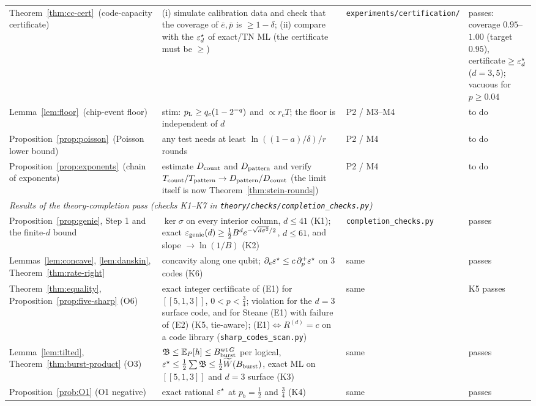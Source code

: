 {\begin{longtable}{p{3.7cm} p{4.5cm} p{3.2cm} p{2.6cm}}
Theorem~\ref{thm:cc-cert}\ (code-capacity certificate) &
(i) simulate calibration data and check that the coverage of $\bar e,\bar p$ is $\ge1-\delta$; (ii) compare with the $\varepsilon^{\star}_d$ of exact/TN ML (the certificate must be $\ge$) &
\texttt{experiments/certification/} & passes: coverage $0.95$--$1.00$ (target $0.95$), certificate $\ge\varepsilon^{\star}_d$ ($d=3,5$); vacuous for $p\ge0.04$ \\
Lemma~\ref{lem:floor}\ (chip-event floor) &
stim: $p_{\mathrm{L}}\ge q_c(1-2^{-q})$ and $\propto r_cT$; the floor is independent of $d$ &
P2 / M3--M4 & to do \\
Proposition~\ref{prop:poisson}\ (Poisson lower bound) &
any test needs at least $\ln((1-a)/\delta)/r$ rounds &
P2 / M4 & to do \\
Proposition~\ref{prop:exponents}\ (chain of exponents) &
estimate $D_{\rm count}$ and $D_{\rm pattern}$ and verify $T_{\rm count}/T_{\rm pattern}\to D_{\rm pattern}/D_{\rm count}$ (the limit itself is now Theorem~\ref{thm:stein-rounds}) &
P2 / M4 & to do \\
\multicolumn{4}{l}{\emph{Results of the theory-completion pass (checks K1--K7 in \texttt{theory/checks/completion\_checks.py})}} \\
Proposition~\ref{prop:genie}, Step 1 and the finite-$d$ bound &
$\ker\sigma$ on every interior column, $d\le41$ (K1); exact $\varepsilon_{\rm genie}(d)\ge\tfrac12B^de^{-\sqrt{d\sigma^2}/2}$, $d\le61$, and slope $\to\ln(1/B)$ (K2) &
\texttt{completion\_checks.py} & passes \\
Lemmas~\ref{lem:concave}, \ref{lem:danskin}, Theorem~\ref{thm:rate-right} &
concavity along one qubit; $\partial_e\varepsilon^{\star}\le c\,\partial_p^+\varepsilon^{\star}$ on 3 codes (K6) & same & passes \\
Theorem~\ref{thm:equality}, Proposition~\ref{prop:five-sharp} (O6) &
exact integer certificate of (E1) for $[[5,1,3]]$, $0<p<\tfrac34$; violation for the $d=3$ surface code, and for Steane (E1) with failure of (E2) (K5, tie-aware); (E1)$\Leftrightarrow R^{(d)}=c$ on a code library (\texttt{sharp\_codes\_scan.py}) & same & K5 passes \\
Lemma~\ref{lem:tilted}, Theorem~\ref{thm:burst-product} (O3) &
$\mathfrak{B}\le\mathbb{E}_P[h]\le B_{\rm burst}^{\operatorname{wt} G}$ per logical, $\varepsilon^{\star}\le\tfrac12\sum\mathfrak{B}\le\tfrac12\widetilde W(B_{\rm burst})$, exact ML on $[[5,1,3]]$ and $d=3$ surface (K3) & same & passes \\
Proposition~\ref{prob:O1} (O1 negative) & exact rational $\varepsilon^{\star}$ at $p_b=\tfrac12$ and $\tfrac34$ (K4) & same & passes \\

\end{longtable}}
